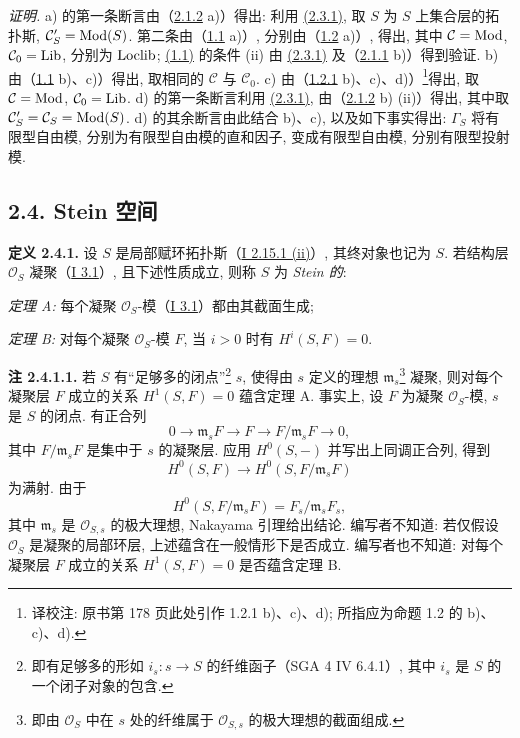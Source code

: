 \emph{证明.} a) 的第一条断言由（\hyperlink{sga6.e02.lem.2-1-2}{2.1.2} a)）得出: 利用 \hyperlink{sga6.e02.para.2-3-1}{(2.3.1)}, 取 $S$ 为 $S$ 上集合层的拓扑斯, $\mathcal C'_S=\operatorname{Mod}(S)$. 第二条由（\hyperlink{sga6.e02.prop.1-1}{1.1} a)）, 分别由（\hyperlink{sga6.e02.prop.1-2}{1.2} a)）, 得出, 其中 $\mathcal C=\operatorname{Mod}$, $\mathcal C_0=\operatorname{Lib}$, 分别为 $\operatorname{Loclib}$; \hyperlink{sga6.e02.prop.1-1}{(1.1)} 的条件 (ii) 由 \hyperlink{sga6.e02.para.2-3-1}{(2.3.1)} 及（\hyperlink{sga6.e02.lem.2-1-1}{2.1.1} b)）得到验证. b) 由（\hyperlink{sga6.e02.prop.1-1}{1.1} b)、c)）得出, 取相同的 $\mathcal C$ 与 $\mathcal C_0$. c) 由（\hyperlink{sga6.e02.prop.1-2}{1.2.1} b)、c)、d)）\footnote{译校注: 原书第 178 页此处引作 1.2.1 b)、c)、d); 所指应为命题 1.2 的 b)、c)、d).}得出, 取 $\mathcal C=\operatorname{Mod}$, $\mathcal C_0=\operatorname{Lib}$. d) 的第一条断言利用 \hyperlink{sga6.e02.para.2-3-1}{(2.3.1)}, 由（\hyperlink{sga6.e02.lem.2-1-2}{2.1.2} b) (ii)）得出, 其中取 $\mathcal C'_S=\mathcal C_S=\operatorname{Mod}(S)$. d) 的其余断言由此结合 b)、c), 以及如下事实得出: $\Gamma_S$ 将有限型自由模, 分别为有限型自由模的直和因子, 变成有限型自由模, 分别有限型投射模.

\subsection*{2.4. Stein 空间}

\textbf{定义 2.4.1.} 设 $S$ 是局部赋环拓扑斯（\hyperlink{sga6.e01.lem.2-15-1}{I 2.15.1 (ii)}）, 其终对象也记为 $S$. 若结构层 $\mathcal O_S$ 凝聚（\hyperlink{sga6.e01.def.3-1}{I 3.1}）, 且下述性质成立, 则称 $S$ 为 \emph{Stein 的}:

\emph{定理 A:} 每个凝聚 $\mathcal O_S$-模（\hyperlink{sga6.e01.def.3-1}{I 3.1}）都由其截面生成;

\emph{定理 B:} 对每个凝聚 $\mathcal O_S$-模 $F$, 当 $i>0$ 时有 $H^i(S,F)=0$.

\textbf{注 2.4.1.1.} 若 $S$ 有“足够多的闭点”\footnote{即有足够多的形如 $i_s:s\to S$ 的纤维函子（SGA 4 IV 6.4.1）, 其中 $i_s$ 是 $S$ 的一个闭子对象的包含.} $s$, 使得由 $s$ 定义的理想 $\mathfrak m_s$\footnote{即由 $\mathcal O_S$ 中在 $s$ 处的纤维属于 $\mathcal O_{S,s}$ 的极大理想的截面组成.} 凝聚, 则对每个凝聚层 $F$ 成立的关系 $H^1(S,F)=0$ 蕴含定理 A. 事实上, 设 $F$ 为凝聚 $\mathcal O_S$-模, $s$ 是 $S$ 的闭点. 有正合列
\[
0\longrightarrow \mathfrak m_sF\longrightarrow F\longrightarrow F/\mathfrak m_sF\longrightarrow0,
\]
其中 $F/\mathfrak m_sF$ 是集中于 $s$ 的凝聚层. 应用 $H^0(S,-)$ 并写出上同调正合列, 得到
\[
H^0(S,F)\longrightarrow H^0(S,F/\mathfrak m_sF)
\]
为满射. 由于
\[
H^0(S,F/\mathfrak m_sF)=F_s/\mathfrak m_sF_s,
\]
其中 $\mathfrak m_s$ 是 $\mathcal O_{S,s}$ 的极大理想, Nakayama 引理给出结论. 编写者不知道: 若仅假设 $\mathcal O_S$ 是凝聚的局部环层, 上述蕴含在一般情形下是否成立. 编写者也不知道: 对每个凝聚层 $F$ 成立的关系 $H^1(S,F)=0$ 是否蕴含定理 B.


